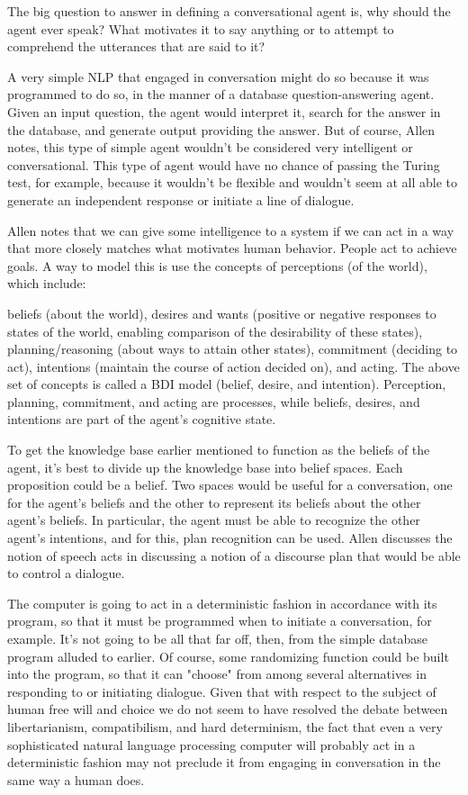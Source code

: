 The big question to answer in defining a conversational agent is, why should the agent ever speak? What motivates it to say anything or to attempt to comprehend the utterances that are said to it?

A very simple NLP that engaged in conversation might do so because it was programmed to do so, in the manner of a database question-answering agent. Given an input question, the agent would interpret it, search for the answer in the database, and generate output providing the answer. But of course, Allen notes, this type of simple agent wouldn't be considered very intelligent or conversational. This type of agent would have no chance of passing the Turing test, for example, because it wouldn't be flexible and wouldn't seem at all able to generate an independent response or initiate a line of dialogue.

Allen notes that we can give some intelligence to a system if we can act in a way that more closely matches what motivates human behavior. People act to achieve goals. A way to model this is use the concepts of perceptions (of the world), which include:

beliefs (about the world),
desires and wants (positive or negative responses to states of the world, enabling comparison of the desirability of these states),
planning/reasoning (about ways to attain other states),
commitment (deciding to act),
intentions (maintain the course of action decided on), and
acting.
The above set of concepts is called a BDI model (belief, desire, and intention). Perception, planning, commitment, and acting are processes, while beliefs, desires, and intentions are part of the agent's cognitive state.

To get the knowledge base earlier mentioned to function as the beliefs of the agent, it's best to divide up the knowledge base into belief spaces. Each proposition could be a belief. Two spaces would be useful for a conversation, one for the agent's beliefs and the other to represent its beliefs about the other agent's beliefs. In particular, the agent must be able to recognize the other agent's intentions, and for this, plan recognition can be used. Allen discusses the notion of speech acts in discussing a notion of a discourse plan that would be able to control a dialogue.

The computer is going to act in a deterministic fashion in accordance with its program, so that it must be programmed when to initiate a conversation, for example. It's not going to be all that far off, then, from the simple database program alluded to earlier. Of course, some randomizing function could be built into the program, so that it can "choose" from among several alternatives in responding to or initiating dialogue. Given that with respect to the subject of human free will and choice we do not seem to have resolved the debate between libertarianism, compatibilism, and hard determinism, the fact that even a very sophisticated natural language processing computer will probably act in a deterministic fashion may not preclude it from engaging in conversation in the same way a human does.

